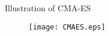 \begin{frame}{Illustration of CMA-ES}
  \begin{figure}
    \texttt{[image: CMAES.eps]}
  \end{figure}
\end{frame}

